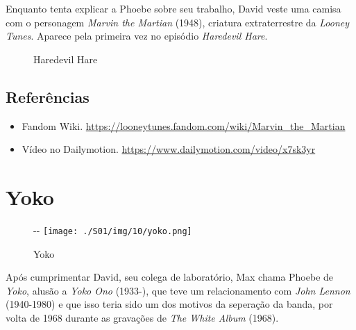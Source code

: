 Enquanto tenta explicar a Phoebe sobre seu trabalho, David veste uma
camisa com o personagem \emph{Marvin the Martian} (1948), criatura
extraterrestre da \emph{Looney Tunes}. Aparece pela primeira vez no
episódio \emph{Haredevil Hare}.

\begin{figure}
  \centering
    \caption{Haredevil Hare\label{fig:haredevil-hare}}
\end{figure}

\hypertarget{referuxeancias-2}{%
\subsection{Referências}\label{referuxeancias-2}}

\begin{itemize}
\tightlist
\item
  \sloppy Fandom Wiki. \url{https://looneytunes.fandom.com/wiki/Marvin_the_Martian}
\item
  \sloppy Vídeo no Dailymotion. \url{https://www.dailymotion.com/video/x7sk3yr}
\end{itemize}

\hypertarget{yoko}{%
\section{Yoko}\label{yoko}}

\begin{figure}[!ht]
  \begin{adjustwidth}{-\oddsidemargin-1in}{-\rightmargin}
    \centering
    \texttt{[image: ./S01/img/10/yoko.png]}
    \caption{Yoko\label{fig:yoko}}
  \end{adjustwidth}
\end{figure}

Após cumprimentar David, seu colega de laboratório, Max chama Phoebe de
\emph{Yoko}, alusão a \emph{Yoko Ono} (1933-), que teve um
relacionamento com \emph{John Lennon} (1940-1980) e que isso teria sido
um dos motivos da seperação da banda, por volta de 1968 durante as
gravações de \emph{The White Album} (1968).

